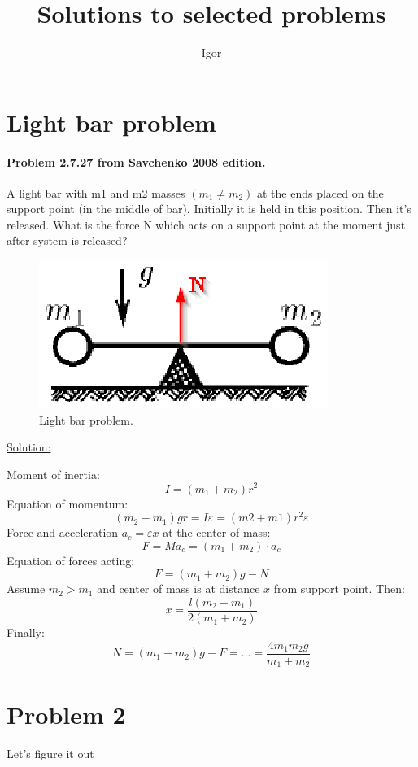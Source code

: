 \documentclass[12pt, letterpaper]{article}
\begin{document}
\title{Solutions to selected problems}
\author{Igor}
\maketitle

\tableofcontents

\newpage
\section{Light bar problem}
\paragraph{Problem 2.7.27 from Savchenko 2008 edition.\\}
A light bar with m1 and m2 masses $(m_1 \neq m_2)$ at the ends placed on the support point (in the middle of  bar). Initially it is held in this position. Then it's released.
What is the force N which acts on a support point at the moment just after system is released?

\begin{figure}[!htbp]
	\centering
	\includegraphics[totalheight=2cm]{./images/LightBarProblem.eps}
	\caption{Light bar problem.}
	\label{fig:verticalcell}
\end{figure}

\noindent\underline{\large Solution:}
\vspace{0.2in}
\begin{addmargin}[1em]{2em}
Moment of inertia:
$$I=(m_1+m_2)r^2$$
Equation of momentum:
$$(m_2-m_1)gr=I\varepsilon=(m2+m1)r^2\varepsilon$$
Force and acceleration $a_c=\varepsilon x$ at the center of mass:
$$F=Ma_c=(m_1+m_2) \cdot a_c$$
Equation of forces acting:
$$F=(m_1+m_2)g-N$$
Assume $m_2>m_1$ and center of mass is at distance $x$ from support point. Then: $$x=\frac {l(m_2-m_1)} {2(m_1+m_2)}$$
Finally: $$N=(m_1+m_2)g-F=...=\frac {4m_1m_2g} {m_1+m_2}$$
\end{addmargin}

\section{Problem 2}
Let's figure it out
\end{document}
